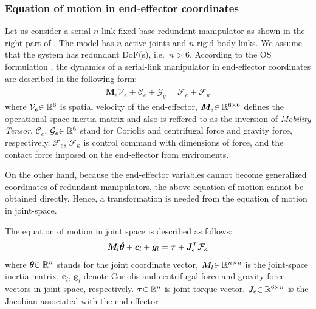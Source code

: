 \subsubsection{Equation of motion in end-effector coordinates}
Let us consider a serial $n$-link fixed base redundant manipulator as shown in the right part of .
The model has $n$-active joints and $n$-rigid body links.
We assume that the system has redundant DoF(s), i.e.\ $n > 6$.
According to the OS formulation \cite{Khatib1987},
the dynamics of a serial-link manipulator in end-effector coordinates are described
in the following form:
%
\begin{align}
  \bm{M}_{e}\dot{\mathcal{V}}_{e} + \mathcal{C}_{e} + \mathcal{G}_{g} = \mathcal{F}_{e} + \mathcal{F}_{\kappa}\label{eq:EOM_EE}
\end{align}
%
where $\mathcal{V}_{e}{\in\mathbb{R}^{6}}$ is spatial velocity of the end-effector,
$\bm{M}_{e}{\in\mathbb{R}^{6 \times 6}}$ defines the operational space inertia matrix and
also is reffered to as the inversion of \textit{Mobility Tensor},
$\mathcal{C}_{e}$, $\mathcal{G}_{e}{\in\mathbb{R}^{6}}$ stand for Coriolis and centrifugal force and
gravity force, respectively.
$\mathcal{F}_{e}$, $\mathcal{F}_{\kappa}$ is control command with dimensions of force,
and the contact force imposed on the end-effector from enviroments.

On the other hand, because the end-effector variables
cannot become generalized coordinates of redundant manipulators,
the above equation of motion cannot be obtained directly.
Hence, a transformation is needed from the equation of motion in joint-space.

The equation of motion in joint space is  described as follows:
%
\begin{align}
  \bm{M}_{l}{\ddot{\bm{\theta}}} + \bm{c}_{l} + \bm{g}_{l} = \bm{\tau} + \bm{J}_{e}^{T}\mathcal{F}_{\kappa}\label{eq:EOM_JOINT}
\end{align}
%
where ${\bm{\theta}}{\in\mathbb{R}^{n}}$ stands for the joint coordinate vector, 
$\bm{M}_{l}{\in\mathbb{R}^{n \times n}}$ is the joint-space inertia matrix,
$\bm{c}_{l}$, $\bm{g}_{l}$ denote Coriolis and centrifugal force and
gravity force vectors in joint-space, respectively.
$\bm{\tau}{\in\mathbb{R}^{n}}$ is joint torque vector,
$\bm{J}_{e}{\in\mathbb{R}^{6 \times n}}$ is the Jacobian associated with the end-effector

